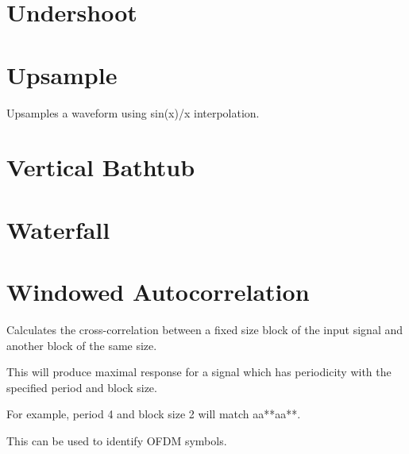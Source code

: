 \section{Undershoot}

\pagebreak
\section{Upsample}

Upsamples a waveform using sin(x)/x interpolation.

\pagebreak
\section{Vertical Bathtub}

\pagebreak
\section{Waterfall}

\pagebreak
\section{Windowed Autocorrelation}

Calculates the cross-correlation between a fixed size block of the input signal and another block of the same size.

This will produce maximal response for a signal which has periodicity with the specified period and block size.

For example, period 4 and block size 2 will match aa**aa**.

This can be used to identify OFDM symbols.
